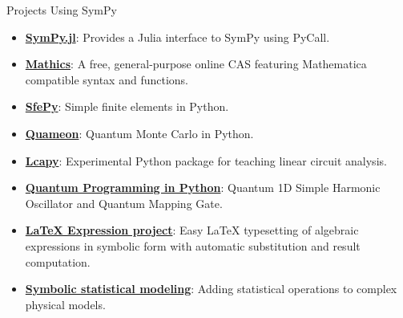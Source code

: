 \documentclass[aspectratio=169,xcolor=svgnames]{beamer}
\begin{document}
\begin{frame}{Projects Using SymPy}
\begin{itemize}
\item
  \href{https://github.com/jverzani/SymPy.jl}{\textbf{SymPy.jl}}:
  Provides a Julia interface to SymPy using PyCall.
\item
  \href{https://mathics.github.io/}{\textbf{Mathics}}: A
  free, general-purpose online CAS featuring Mathematica compatible
  syntax and functions.
\item
  \href{http://sfepy.org/}{\textbf{SfePy}}: Simple finite elements in
  Python.
\item
  \href{http://quameon.sourceforge.net/}{\textbf{Quameon}}: Quantum
  Monte Carlo in Python.
\item
  \href{http://lcapy.elec.canterbury.ac.nz/}{\textbf{Lcapy}}:
  Experimental Python package for teaching linear circuit analysis.
\item
  \href{http://digitalcommons.calpoly.edu/cgi/viewcontent.cgi?article=1072\&context=physsp/}{\textbf{Quantum
  Programming in Python}}: Quantum 1D Simple Harmonic Oscillator and
  Quantum Mapping Gate.
\item
  \href{http://mech.fsv.cvut.cz/~stransky/software/latexexpr/doc/}{\textbf{LaTeX
  Expression project}}: Easy \LaTeX{} typesetting of algebraic expressions
  in symbolic form with automatic substitution and result computation.
\item
  \href{https://www.researchgate.net/publication/260585491_Symbolic_Statistics_with_SymPy/}{\textbf{Symbolic
  statistical modeling}}: Adding statistical operations to complex
  physical models.
\end{itemize}
  \end{frame}
\end{document}
